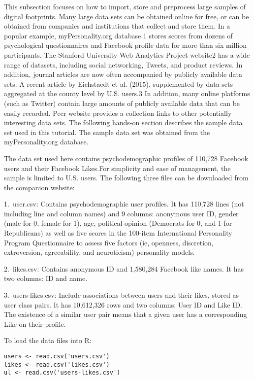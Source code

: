 This subsection focuses on how to import, store and preprocess 
large 
samples of digital footprints. Many large data sets can be obtained
 online for free, or can be obtained from companies and 
institutions that collect and store them. In a popular example, 
myPersonality.org database 1 stores scores from dozens of 
psychological questionnaires and Facebook profile data for more 
than six million participants. The Stanford University Web 
Analytics Project website2 has a wide range of datasets, including
 social networking, Tweets, and product reviews. In addition, 
journal articles are now often accompanied by publicly available 
data sets. A recent article by Eichstaedt et al. (2015), 
supplemented by data sets aggregated at the county level by U.S. 
users.3 In addition, many online platforms (such as Twitter) 
contain large amounts of publicly available data that can be easily
 recorded. Peer website provides a collection links to other 
potentially interesting data sets. The following hands-on section 
describes the sample data set used in this tutorial. The sample 
data set was obtained from the myPersonality.org database.

The data set used here contains psychodemographic profiles of 
110,728 Facebook users and their Facebook Likes.For simplicity and
 ease of management, the sample is limited to U.S. users. The 
following three files can be downloaded from the companion website:

1.\ user.csv: Contains psychodemographic user profiles. It has 
110,728 lines (not including line and column names) and 9 columns:
 anonymous user ID, gender (male for 0, female for 1), age, 
political opinion (Democrats for 0, and 1 for Republicans) 
as well as five scores in the 100-item International Personality 
Program Questionnaire to assess five factors (ie, openness, 
discretion, extroversion, agreeability, and neuroticism) 
personality models.

2.\ likes.csv: Contains anonymous ID and 1,580,284 Facebook like 
names. It has two columns: ID and name.

3.\ users-likes.csv: Include associations between users and their 
likes, stored as user class pairs. It has 10,612,326 rows and two 
columns: User ID and Like ID. The existence of a similar user pair
 means that a given user has a corresponding Like on their profile.

To load the data files into R:

\begin{verbatim}
users <- read.csv('users.csv')
likes <- read.csv('likes.csv')
ul <- read.csv('users-likes.csv')
\end{verbatim}


